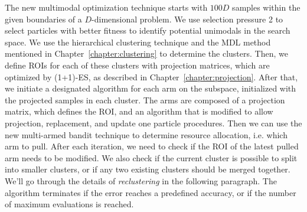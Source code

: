 The new multimodal optimization technique starts with $100D$ samples within the given boundaries of a $D$-dimensional problem.
We use selection pressure 2 to select particles with better fitness to identify potential unimodals in the search space.
We use the hierarchical clustering technique and the MDL method mentioned in Chapter~\ref{chapter:clustering} to determine the clusters.
Then, we define ROIs for each of these clusters with projection matrices, 
which are optimized by (1+1)-ES, as described in Chapter~\ref{chapter:projection}.
After that, we initiate a designated algorithm for each arm on the subspace, initialized with the projected samples in each cluster.
The arms are composed of a projection matrix, which defines the ROI, 
and an algorithm that is modified to allow projection, replacement, and update one particle procedures.
Then we can use the new multi-armed bandit technique to determine resource allocation, i.e. which arm to pull. 
After each iteration, we need to check if the ROI of the latest pulled arm needs to be modified.
We also check if the current cluster is possible to split into smaller clusters, or if any two existing clusters should be merged together.
We'll go through the details of \textit{reclustering} in the following paragraph.
The algorithm terminates if the error reaches a predefined accuracy, or if the number of maximum evaluations is reached.





%
%
%
%
%





